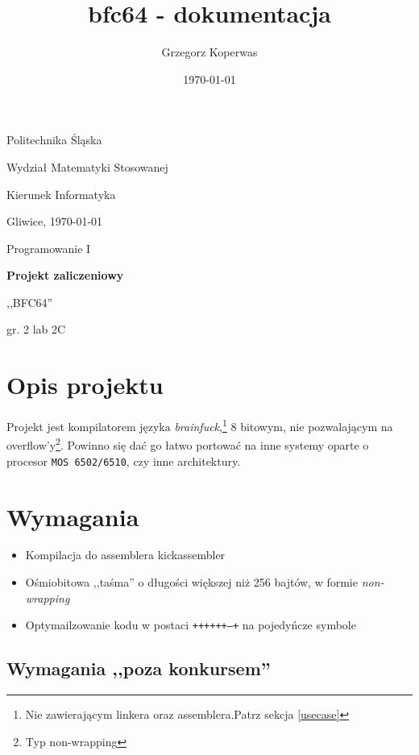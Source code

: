\documentclass[a4paper,12pt]{article}
\title{bfc64 - dokumentacja}
\author{Grzegorz Koperwas}
\date{\today}
\begin{document}
    \begin{titlepage}
    Politechnika Śląska

    Wydział Matematyki Stosowanej

    Kierunek Informatyka

    \begin{center}
        Gliwice, \today

        \vspace{2cm}

        \Large{Programowanie I}

        \vspace{5mm}

        \Large{\bfseries{Projekt zaliczeniowy}}

        \vspace{5mm}

        \large{,,BFC64''}

        \vspace{2cm}

        \theauthor{} gr. 2 lab 2C
	\end{center}
	\thispagestyle{empty}
    \end{titlepage}
    \tableofcontents
    \section{Opis projektu}

    Projekt jest kompilatorem języka \emph{brainfuck},\footnote{Nie zawierającym linkera oraz assemblera.Patrz sekcja \ref{usecase}} 8 bitowym, nie pozwalającym na overflow'y\footnote{Typ non-wrapping}. Powinno się dać go łatwo portować na inne systemy oparte o procesor \texttt{MOS 6502/6510}, czy inne architektury.

    \section{Wymagania}

    \begin{itemize}
        \item Kompilacja do assemblera kickassembler
        \item Ośmiobitowa ,,taśma'' o długości większej niż 256 bajtów, w formie \emph{non-wrapping}
        \item Optymailzowanie kodu w postaci \texttt{++++++--+} na pojedyńcze symbole
    \end{itemize}

    \subsection*{Wymagania ,,poza konkursem''}
\end{document}
